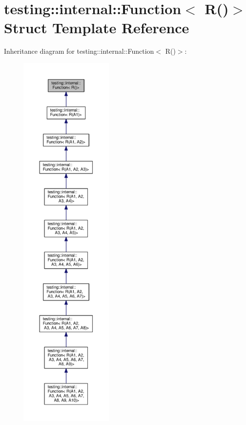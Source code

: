\hypertarget{structtesting_1_1internal_1_1Function_3_01R_07_08_4}{}\section{testing\+:\+:internal\+:\+:Function$<$ R()$>$ Struct Template Reference}
\label{structtesting_1_1internal_1_1Function_3_01R_07_08_4}


Inheritance diagram for testing\+:\+:internal\+:\+:Function$<$ R()$>$\+:\nopagebreak
\begin{figure}[H]
\begin{center}
\leavevmode
\includegraphics[height=550pt]{structtesting_1_1internal_1_1Function_3_01R_07_08_4__inherit__graph}
\end{center}
\end{figure}
